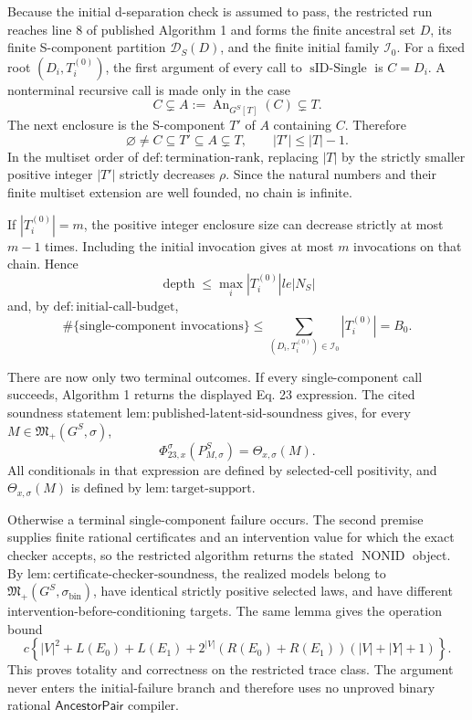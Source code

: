 Because the initial d-separation check is assumed to pass, the restricted run reaches line 8 of published Algorithm 1 and forms the finite ancestral set \(D\), its finite S-component partition \(\mathcal D_S(D)\), and the finite initial family \(\mathcal I_0\). For a fixed root \((D_i,T_i^{(0)})\), the first argument of every call to \(\operatorname{sID\text{-}Single}\) is \(C=D_i\). A nonterminal recursive call is made only in the case
\[
 C\subsetneq A:=\operatorname{An}_{G^S[T]}(C)
 \subsetneq T.
\]
The next enclosure is the S-component \(T'\) of \(A\) containing \(C\). Therefore
\[
 \varnothing\ne C\subseteq T'\subseteq A\subsetneq T,
 \qquad |T'|\le |T|-1.
\]
In the multiset order of \(\mathrm{def:termination\text{-}rank}\), replacing \(|T|\) by the strictly smaller positive integer \(|T'|\) strictly decreases \(\rho\). Since the natural numbers and their finite multiset extension are well founded, no chain is infinite.

If \(|T_i^{(0)}|=m\), the positive integer enclosure size can decrease strictly at most \(m-1\) times. Including the initial invocation gives at most \(m\) invocations on that chain. Hence
\[
 \operatorname{depth}\le\max_i|T_i^{(0)}|le |N_S|
\]
and, by \(\mathrm{def:initial\text{-}call\text{-}budget}\),
\[
 \#\{\text{single-component invocations}\}
 \le\sum_{(D_i,T_i^{(0)})\in\mathcal I_0}|T_i^{(0)}|
 =B_0.
\]

There are now only two terminal outcomes. If every single-component call succeeds, Algorithm 1 returns the displayed Eq. 23 expression. The cited soundness statement \(\mathrm{lem:published\text{-}latent\text{-}sid\text{-}soundness}\) gives, for every \(M\in\mathfrak M_+(G^S,\sigma)\),
\[
 \Phi_{23,x}^{\sigma}(P_{M,\sigma}^S)
 =\Theta_{x,\sigma}(M).
\]
All conditionals in that expression are defined by selected-cell positivity, and \(\Theta_{x,\sigma}(M)\) is defined by \(\mathrm{lem:target\text{-}support}\).

Otherwise a terminal single-component failure occurs. The second premise supplies finite rational certificates and an intervention value for which the exact checker accepts, so the restricted algorithm returns the stated \(\operatorname{NONID}\) object. By \(\mathrm{lem:certificate\text{-}checker\text{-}soundness}\), the realized models belong to \(\mathfrak M_+(G^S,\sigma_{\mathrm{bin}})\), have identical strictly positive selected laws, and have different intervention-before-conditioning targets. The same lemma gives the operation bound
\[
 c\left\{|V|^2+L(E_0)+L(E_1)
 +2^{|V|}(R(E_0)+R(E_1))(|V|+|Y|+1)\right\}.
\]
This proves totality and correctness on the restricted trace class. The argument never enters the initial-failure branch and therefore uses no unproved binary rational \(\mathsf{AncestorPair}\) compiler.